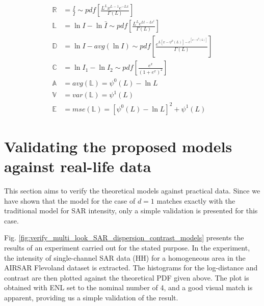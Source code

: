 \documentclass[journal]{IEEEtran}
\begin{document}
  \begin{align*}
    \mathbb{R} &= \frac{I}{\bar{I}} \sim pdf \left[ \frac{ L^{L} x^{L-1} e^{-Lx}}{ \Gamma(L)} \label{eqn:multi_look_SAR_ratio_dist} \right]\\
    \mathbb{L} &= \ln{I} - \ln{\bar{I}} \sim pdf \left[ \frac{L^Le^{Lt-Le^t}}{ \Gamma(L)}  \right] \\
    \mathbb{D} &= \ln{I} - avg(\ln{I}) \sim pdf \left[ \frac{e^{L[x-\psi^0(L)]-e^{[x-\psi^0(L)]}}}{\Gamma(L)} \right] \\
    \mathbb{C} &= \ln{I_1} - \ln{I_2} \sim pdf \left[ \frac{e^{x}}{(1+e^x)^{2}} \right] \\
    \mathbb{A} &= avg(\mathbb{L}) = \psi^0(L) - \ln{L} \\
    \mathbb{V} &= var(\mathbb{L}) = \psi^1(L) \\
    \mathbb{E} &= mse(\mathbb{L}) = \left[ \psi^0(L) - \ln{L} \right]^2 + \psi^1(L)
  \end{align*}

     
\section{Validating the proposed models against real-life data}
\label{sec:polsar_models_validation}

This section aims to verify the theoretical models against practical data.
Since we have shown that the model for the case of $d=1$ matches exactly with the traditional model for SAR intensity,
  only a simple validation is presented for this case.

Fig. \ref{fig:verify_multi_look_SAR_dispersion_contrast_models} presents the results of an experiment carried out for the stated purpose.
In the experiment, the intensity of single-channel SAR data (HH) for a homogeneous area in the AIRSAR Flevoland dataset is extracted.
The histograms for the log-distance and contrast are then plotted against the theoretical PDF given above.
 The plot is obtained with ENL set to the nominal number of 4, and a good visual match is apparent, providing us a simple validation of the result.
\end{document}

